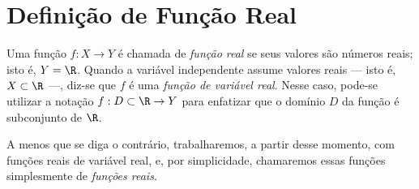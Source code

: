 \section{Definição de Função Real}

\begin{definition}
    Uma função $f: X \to Y$ é chamada de \emph{função real} se seus valores são números reais; isto é, $Y = \R$.
    Quando a variável independente assume valores reais --- isto é, $X \subset \R$ ---, diz-se que $f$ é uma \emph{função de variável real}. Nesse caso, pode-se utilizar a notação $f:D\subset \R \to Y$ para enfatizar que o domínio $D$ da função é subconjunto de $\R$.
\end{definition}

A menos que se diga o contrário, trabalharemos, a partir desse momento, com funções reais de variável real, e, por simplicidade, chamaremos essas funções simplesmente de \emph{funções reais}. 